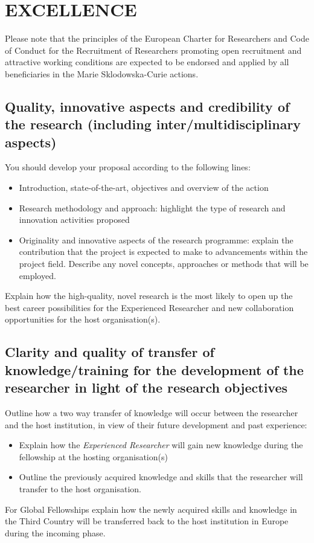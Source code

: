 \documentclass[a4paper,11pt]{article}
\begin{document}
\newpage

\section{EXCELLENCE}
\label{sec:excellence}

Please note that the principles of the European Charter for Researchers and Code of Conduct for the Recruitment of Researchers promoting open recruitment and attractive working conditions are expected to be endorsed and applied by all beneficiaries in the Marie Sklodowska-Curie actions.

\subsection{Quality, innovative aspects and credibility of the research (including inter/multidisciplinary aspects)}
\label{sec:quality}

You should develop your proposal according to the following lines:
\begin{itemize}
\item Introduction, state-of-the-art, objectives and overview of the action
\item Research methodology and approach: highlight the type of research and innovation activities proposed
\item Originality and innovative aspects of the research programme: explain the contribution that the project is expected to make to advancements within the project field. Describe any novel concepts, approaches or methods that will be employed.
\end{itemize}
Explain how the high-quality, novel research is the most likely to open up the best career possibilities for the Experienced Researcher and new collaboration opportunities for the host organisation(s). 

\subsection{Clarity and quality of transfer of knowledge/training for the development of the researcher in light of the research objectives}
\label{sec:transfer}

Outline how a two way transfer of knowledge will occur between the researcher and the host institution, in view of their future development and past experience:
\begin{itemize}
\item Explain how the \emph{Experienced Researcher} will gain new knowledge during the fellowship at the hosting organisation(s)
\item Outline the previously acquired knowledge and skills that the researcher will transfer to the host organisation.
\end{itemize}
For Global Fellowships explain how the newly acquired skills and knowledge in the Third Country will be transferred back to the host institution in Europe during the incoming phase.
\end{document}
